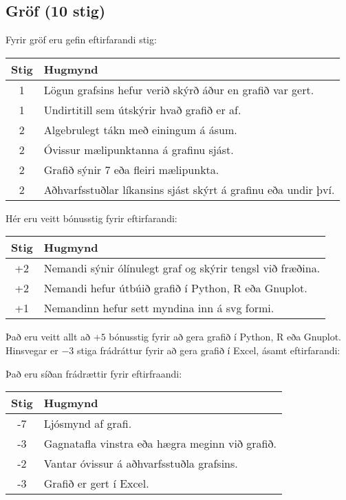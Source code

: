 \begin{tcolorbox}
\subsection*{Gröf (10 stig)}

Fyrir gröf eru gefin eftirfarandi stig:

\begin{table}[H]
    \centering
    \begin{tabular}{|c|l|}
    \hline
       \textbf{Stig}  & \textbf{Hugmynd}   \\ \hline \hline
        1  & Lögun grafsins hefur verið skýrð áður en grafið var gert. \\ \hline
         1  & Undirtitill sem útskýrir hvað grafið er af. \\ \hline
        2  & Algebrulegt tákn með einingum á ásum. \\ \hline
        2  & Óvissur mælipunktanna á grafinu sjást. \\ \hline
        2  & Grafið sýnir 7 eða fleiri mælipunkta. \\ \hline
        2  & Aðhvarfsstuðlar líkansins sjást skýrt á grafinu eða undir því. \\ \hline
    \end{tabular}
\end{table}


Hér eru veitt bónusstig fyrir eftirfarandi:

\begin{table}[H]
    \centering
    \begin{tabular}{|c|l|}
    \hline
       \textbf{Stig}  & \textbf{Hugmynd}   \\ \hline \hline
         +2  & Nemandi sýnir ólínulegt graf og skýrir tengsl við fræðina. \\ \hline
        +2  & Nemandi hefur útbúið grafið í Python, R eða Gnuplot. \\ \hline
        +1  & Nemandinn hefur sett myndina inn á svg formi.  \\ \hline
    \end{tabular}
\end{table}

Það eru veitt allt að $+5$ bónusstig fyrir að gera grafið í Python, R eða Gnuplot. Hinsvegar er $-3$ stiga frádráttur fyrir að gera grafið í Excel, ásamt eftirfarandi:

Það eru síðan frádrættir fyrir eftirfraandi:

\begin{table}[H]
    \centering
    \begin{tabular}{|c|l|}
    \hline
       \textbf{Stig}  & \textbf{Hugmynd}   \\ \hline \hline
         -7  & Ljósmynd af grafi. \\ \hline
        -3  & Gagnatafla vinstra eða hægra meginn við grafið. \\ \hline
        -2  & Vantar óvissur á aðhvarfsstuðla grafsins. \\ \hline
        -3 & Grafið er gert í Excel. \\ \hline
    \end{tabular}
\end{table}


\end{tcolorbox}
